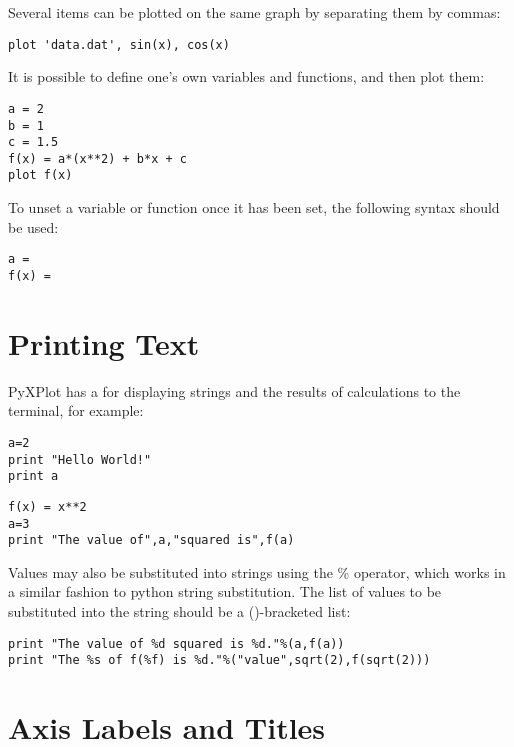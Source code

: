 Several items can be plotted on the same graph by separating them by commas:

\begin{verbatim}
plot 'data.dat', sin(x), cos(x)
\end{verbatim}

\noindent It is possible to define one's own variables and functions, and then
plot them:

\begin{verbatim}
a = 2
b = 1
c = 1.5
f(x) = a*(x**2) + b*x + c
plot f(x)
\end{verbatim}

\noindent To unset a variable or function once it has been set, the following
syntax should be
used:

\begin{verbatim}
a =
f(x) =
\end{verbatim}

\section{Printing Text}

PyXPlot has a  for displaying strings and the results of
calculations to the terminal, for example:

\begin{verbatim}
a=2
print "Hello World!"
print a
\end{verbatim}

\begin{verbatim}
f(x) = x**2
a=3
print "The value of",a,"squared is",f(a)
\end{verbatim}

\noindent Values may also be substituted into strings using the \%
operator, which works in a similar fashion to python string
substitution. The list of values to be substituted
into the string should be a ()-bracketed list:

\begin{verbatim}
print "The value of %d squared is %d."%(a,f(a))
print "The %s of f(%f) is %d."%("value",sqrt(2),f(sqrt(2)))
\end{verbatim}

\section{Axis Labels and Titles}
\label{sec:latex_incompatibility}

